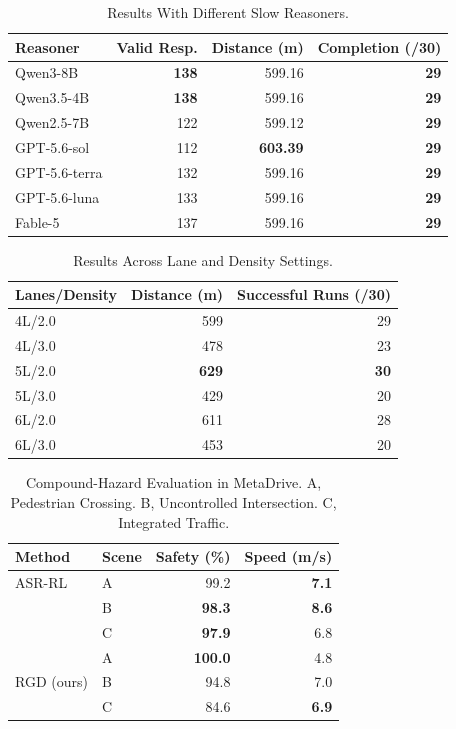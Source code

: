 \documentclass[letterpaper,journal]{IEEEtran}
\begin{document}
\begin{table}[!t]
\centering
\caption{Results With Different Slow Reasoners.}
\label{tab:multi_llm}
\scriptsize
\renewcommand{\arraystretch}{0.95}
\setlength{\tabcolsep}{2.0pt}
\begin{tabular*}{\linewidth}{@{\extracolsep{\fill}}lrrr@{}}
\toprule
\textbf{Reasoner} & \textbf{Valid Resp.} & \textbf{Distance (m)} & \textbf{Completion (/30)}\\
\midrule
Qwen3-8B & \textbf{138} & 599.16 & \textbf{29}\\
Qwen3.5-4B & \textbf{138} & 599.16 & \textbf{29}\\
Qwen2.5-7B & 122 & 599.12 & \textbf{29}\\
GPT-5.6-sol & 112 & \textbf{603.39} & \textbf{29}\\
GPT-5.6-terra & 132 & 599.16 & \textbf{29}\\
GPT-5.6-luna & 133 & 599.16 & \textbf{29}\\
Fable-5 & 137 & 599.16 & \textbf{29}\\
\bottomrule
\end{tabular*}
\end{table}

\begin{table}[!t]
\centering
\caption{Results Across Lane and Density Settings.}
\label{tab:traffic_stress}
\scriptsize
\renewcommand{\arraystretch}{0.95}
\setlength{\tabcolsep}{2.0pt}
\begin{tabular*}{\linewidth}{@{\extracolsep{\fill}}lrr@{}}
\toprule
\textbf{Lanes/Density} & \textbf{Distance (m)} &
\textbf{Successful Runs (/30)}\\
\midrule
4L/2.0 & 599 & 29\\
4L/3.0 & 478 & 23\\
5L/2.0 & \textbf{629} & \textbf{30}\\
5L/3.0 & 429 & 20\\
6L/2.0 & 611 & 28\\
6L/3.0 & 453 & 20\\
\bottomrule
\end{tabular*}
\end{table}
\begin{table}[!t]
\centering
\caption{Compound-Hazard Evaluation in MetaDrive. A, Pedestrian Crossing.
B, Uncontrolled Intersection. C, Integrated Traffic.}
\label{tab:policy_transfer}
\scriptsize
\renewcommand{\arraystretch}{0.95}
\setlength{\tabcolsep}{2.0pt}
\begin{tabular*}{\linewidth}{@{\extracolsep{\fill}}llrr@{}}
\toprule
\textbf{Method} & \textbf{Scene} & \textbf{Safety (\%)} & \textbf{Speed (m/s)}\\
\midrule
ASR-RL~\cite{titsPolicyTransfer2025}
& A & 99.2 & \textbf{7.1}\\
& B & \textbf{98.3} & \textbf{8.6}\\
& C & \textbf{97.9} & 6.8\\
\midrule
\multirow{3}{*}{RGD (ours)}
& A & \textbf{100.0} & 4.8\\
& B & 94.8 & 7.0\\
& C & 84.6 & \textbf{6.9}\\
\bottomrule
\end{tabular*}
\end{table}
\end{document}
